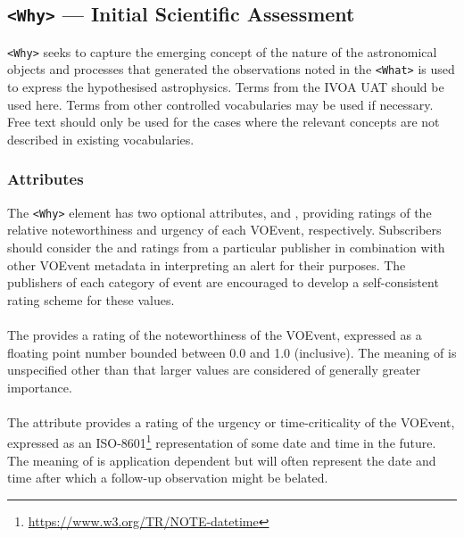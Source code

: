 \documentclass[11pt,a4paper]{ivoa}
\begin{document}
\subsection{\texttt{<Why>} --- Initial Scientific Assessment}
\label{sec:3.6}
\verb|<Why>| seeks to capture the emerging concept of the nature of the
astronomical objects and processes that generated the observations noted in the
\verb|<What>| is used to express the hypothesised astrophysics. Terms from
the IVOA UAT \citep{2022ivoa.spec.0722D} should be used here. Terms from other
controlled vocabularies may be used if necessary. Free text should only be used
for the cases where the relevant concepts are not described in existing vocabularies.

\subsubsection{Attributes}
The \verb|<Why>| element has two optional attributes, 
and , providing ratings of the relative noteworthiness and
urgency of each VOEvent, respectively. Subscribers should consider the
 and  ratings from a particular publisher
in combination with other VOEvent
metadata in interpreting an alert for their purposes. The publishers of each
category of event are encouraged to develop a self-consistent rating scheme for
these values.

\paragraph{}\label{sec:3.6.1}
The  provides a rating of the noteworthiness of the VOEvent,
expressed as a floating point number bounded between 0.0 and 1.0 (inclusive).
The meaning of  is unspecified other than that larger values are
considered of generally greater importance.

\paragraph{}\label{sec:3.6.2}
The  attribute provides a rating of the urgency or time-criticality
of the VOEvent, expressed as an ISO-8601\footnote{\url{https://www.w3.org/TR/NOTE-datetime}}
representation of some date and time in
the future. The meaning of  is application dependent but will often
represent the date and time after which a follow-up observation might be
belated.
\end{document}
